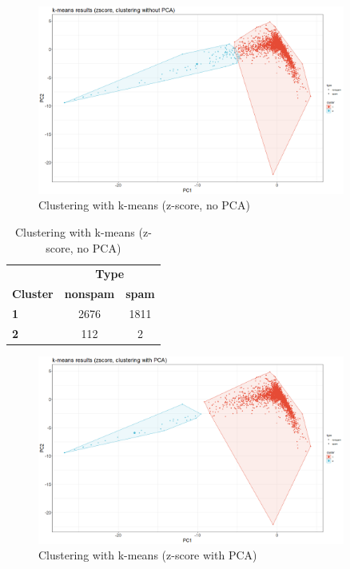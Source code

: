 \documentclass{article}
\begin{document}
	\begin{figure}[h]
		\centering
		\includegraphics[width=0.9\textwidth]{proj2_plots/kmeans_res_scaled.png}
		\caption{Clustering with k-means (z-score, no PCA)}
		\label{fig::clust_kmeans_scaled}
	\end{figure}

	\begin{table}[h]
		\centering
		\begin{tabular}{lcc}
			& \multicolumn{2}{c}{\textbf{Type}} \\
			\textbf{Cluster} & \textbf{nonspam} & \textbf{spam} \\
			\textbf{1} & 2676 & 1811 \\
			\textbf{2} & 112 & 2 \\
		\end{tabular}
		\caption{Clustering with k-means (z-score, no PCA)}
		\label{tab::clust_kmeans_scaled}
	\end{table}

	\begin{figure}[h]
		\centering
		\includegraphics[width=0.9\textwidth]{proj2_plots/kmeans_res_scaled_pca.png}
		\caption{Clustering with k-means (z-score with PCA)}
		\label{fig::clust_kmeans_scaled_pca}
	\end{figure}
\end{document}
